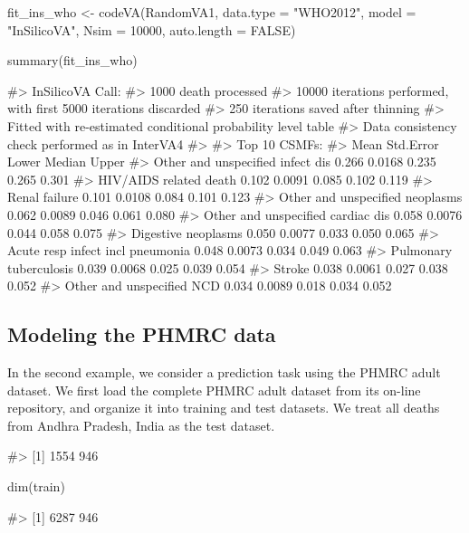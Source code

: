 \begin{Schunk}
\begin{Sinput}
fit_ins_who <- codeVA(RandomVA1, data.type = "WHO2012", model = "InSilicoVA",
                    Nsim = 10000, auto.length = FALSE)
\end{Sinput}
\end{Schunk}

\begin{Schunk}
\begin{Sinput}
summary(fit_ins_who) 
\end{Sinput}
\begin{Soutput}
#> InSilicoVA Call: 
#> 1000 death processed
#> 10000 iterations performed, with first 5000 iterations discarded
#>  250 iterations saved after thinning
#> Fitted with re-estimated conditional probability level table
#> Data consistency check performed as in InterVA4
#> 
#> Top 10 CSMFs:
#>                                    Mean Std.Error Lower Median Upper
#> Other and unspecified infect dis  0.266    0.0168 0.235  0.265 0.301
#> HIV/AIDS related death            0.102    0.0091 0.085  0.102 0.119
#> Renal failure                     0.101    0.0108 0.084  0.101 0.123
#> Other and unspecified neoplasms   0.062    0.0089 0.046  0.061 0.080
#> Other and unspecified cardiac dis 0.058    0.0076 0.044  0.058 0.075
#> Digestive neoplasms               0.050    0.0077 0.033  0.050 0.065
#> Acute resp infect incl pneumonia  0.048    0.0073 0.034  0.049 0.063
#> Pulmonary tuberculosis            0.039    0.0068 0.025  0.039 0.054
#> Stroke                            0.038    0.0061 0.027  0.038 0.052
#> Other and unspecified NCD         0.034    0.0089 0.018  0.034 0.052
\end{Soutput}
\end{Schunk}

\hypertarget{modeling-the-phmrc-data}{%
\subsection{Modeling the PHMRC data}\label{modeling-the-phmrc-data}}

In the second example, we consider a prediction task using the PHMRC
adult dataset. We first load the complete PHMRC adult dataset from its
on-line repository, and organize it into training and test datasets. We
treat all deaths from Andhra Pradesh, India as the test dataset.

\begin{Schunk}
\begin{Soutput}
#> [1] 1554  946
\end{Soutput}
\begin{Sinput}
dim(train)
\end{Sinput}
\begin{Soutput}
#> [1] 6287  946
\end{Soutput}
\end{Schunk}

